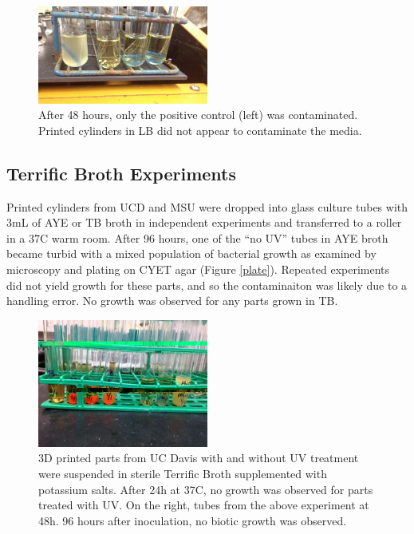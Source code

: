 \begin{refsection}
\begin{figure}[h!]
  \centering
    \includegraphics[width=0.5\textwidth]{sterility/figures/Fig6}

    \caption{After 48 hours, only the positive control (left) was
      contaminated. Printed cylinders in LB did not appear to
      contaminate the media.}

\end{figure}

\subsection{Terrific Broth Experiments}

Printed cylinders from UCD and MSU were dropped into glass culture
tubes with 3mL of AYE or TB broth in independent experiments and
transferred to a roller in a 37C warm room. After 96 hours, one of the
``no UV'' tubes in AYE broth became turbid with a mixed population of
bacterial growth as examined by microscopy and plating on CYET agar
(Figure \ref{plate}). Repeated experiments did not yield growth for
these parts, and so the contaminaiton was likely due to a handling
error. No growth was observed for any parts grown in TB.

\begin{figure}[!h]
  \centering
    \includegraphics[width=0.5\textwidth]{sterility/figures/Fig7}
    
    \caption{3D printed parts from UC Davis with and without UV
      treatment were suspended in sterile Terrific Broth supplemented
      with potassium salts. After 24h at 37C, no growth was observed
      for parts treated with UV. On the right, tubes from the above
      experiment at 48h. 96 hours after inoculation, no biotic growth
      was observed.}


\end{figure}
\end{refsection}

